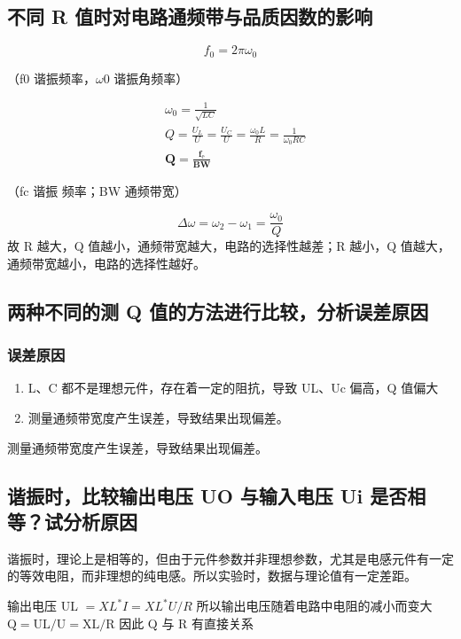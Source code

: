 \documentclass{article}
\begin{document}
\subsection{不同 R 值时对电路通频带与品质因数的影响}
$$
f_0=2 \pi \omega_0
$$

（f0 谐振频率，$\omega 0$ 谐振角频率）

$$
\begin{aligned}
& \omega_0=\frac{1}{\sqrt{L C}} \\
& Q=\frac{U_L}{U}=\frac{U_C}{U}=\frac{\omega_0 L}{R}=\frac{1}{\omega_0 R C} \\
& \mathbf{Q}=\frac{\mathbf{f}_{\mathrm{e}}}{\mathbf{B W}}
\end{aligned}
$$

（fc 谐振 频率；BW 通频带宽）

$$
\Delta \omega=\omega_2-\omega_1=\frac{\omega_0}{Q}
$$
故 R 越大，Q 值越小，通频带宽越大，电路的选择性越差；R 越小，Q 值越大，通频带宽越小，电路的选择性越好。

\subsection{两种不同的测 Q 值的方法进行比较，分析误差原因}


\subsubsection{误差原因}
\begin{enumerate}
        \item L、C 都不是理想元件，存在着一定的阻抗，导致 UL、Uc 偏高，Q 值偏大
        \item 测量通频带宽度产生误差，导致结果出现偏差。
       
    \end{enumerate} 

测量通频带宽度产生误差，导致结果出现偏差。

\subsection{谐振时，比较输出电压 UO 与输入电压 Ui 是否相等？试分析原因}
谐振时，理论上是相等的，但由于元件参数并非理想参数，尤其是电感元件有一定的等效电阻，而非理想的纯电感。所以实验时，数据与理论值有一定差距。

输出电压 UL $=X L^* I=X L^* U / R$
所以输出电压随着电路中电阻的减小而变大
$\mathrm{Q}=\mathrm{UL} / \mathrm{U}=\mathrm{XL} / \mathrm{R}$ 因此 Q 与 R 有直接关系
\end{document}
